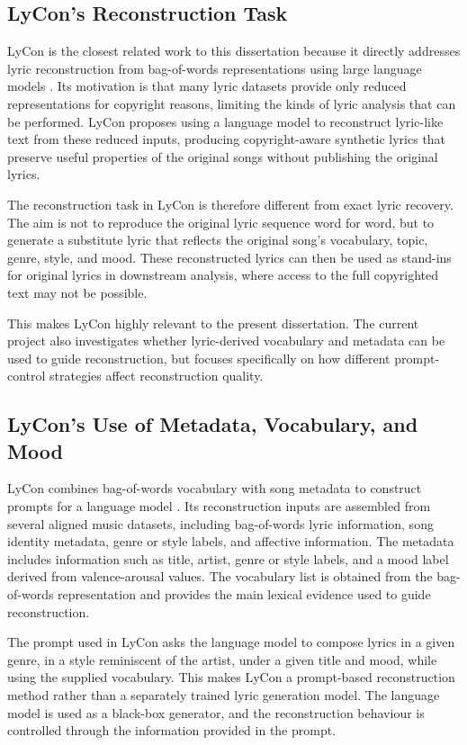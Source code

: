 \subsection{LyCon's Reconstruction Task}

LyCon is the closest related work to this dissertation because it directly addresses lyric reconstruction from bag-of-words representations using large language models \cite{kim2024lycon}. Its motivation is that many lyric datasets provide only reduced representations for copyright reasons, limiting the kinds of lyric analysis that can be performed. LyCon proposes using a language model to reconstruct lyric-like text from these reduced inputs, producing copyright-aware synthetic lyrics that preserve useful properties of the original songs without publishing the original lyrics.

The reconstruction task in LyCon is therefore different from exact lyric recovery. The aim is not to reproduce the original lyric sequence word for word, but to generate a substitute lyric that reflects the original song's vocabulary, topic, genre, style, and mood. These reconstructed lyrics can then be used as stand-ins for original lyrics in downstream analysis, where access to the full copyrighted text may not be possible.

This makes LyCon highly relevant to the present dissertation. The current project also investigates whether lyric-derived vocabulary and metadata can be used to guide reconstruction, but focuses specifically on how different prompt-control strategies affect reconstruction quality.

\subsection{LyCon's Use of Metadata, Vocabulary, and Mood}

LyCon combines bag-of-words vocabulary with song metadata to construct prompts for a language model \cite{kim2024lycon}. Its reconstruction inputs are assembled from several aligned music datasets, including bag-of-words lyric information, song identity metadata, genre or style labels, and affective information. The metadata includes information such as title, artist, genre or style labels, and a mood label derived from valence-arousal values. The vocabulary list is obtained from the bag-of-words representation and provides the main lexical evidence used to guide reconstruction.

The prompt used in LyCon asks the language model to compose lyrics in a given genre, in a style reminiscent of the artist, under a given title and mood, while using the supplied vocabulary. This makes LyCon a prompt-based reconstruction method rather than a separately trained lyric generation model. The language model is used as a black-box generator, and the reconstruction behaviour is controlled through the information provided in the prompt.

